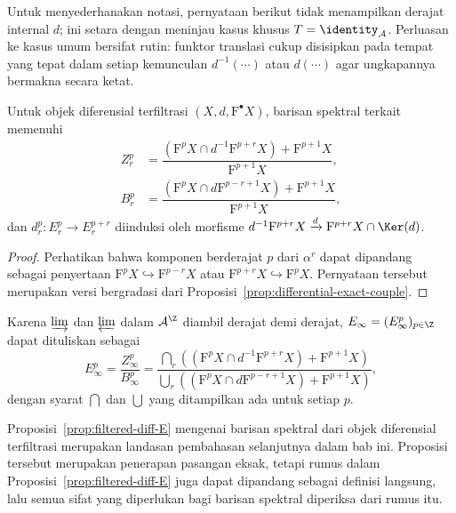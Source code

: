 Untuk menyederhanakan notasi, pernyataan berikut tidak menampilkan derajat
internal $d$; ini setara dengan meninjau kasus khusus
$T=\identity_{\mathcal{A}}$. Perluasan ke kasus umum bersifat rutin: funktor
translasi cukup disisipkan pada tempat yang tepat dalam setiap kemunculan
$d^{-1}(\cdots)$ atau $d(\cdots)$ agar ungkapannya bermakna secara ketat.

\begin{proposition}\label{prop:filtered-diff-E}
	Untuk objek diferensial terfiltrasi $(X,d,\mathrm{F}^\bullet X)$, barisan
	spektral terkait memenuhi
	\begin{align*}
		Z_r^p&=\dfrac{\left(\mathrm{F}^pX\cap d^{-1}\mathrm{F}^{p+r}X\right)
		+\mathrm{F}^{p+1}X}{\mathrm{F}^{p+1}X}, \\
		B_r^p&=\dfrac{\left(\mathrm{F}^pX\cap d\mathrm{F}^{p-r+1}X\right)
		+\mathrm{F}^{p+1}X}{\mathrm{F}^{p+1}X},
	\end{align*}
	dan $d_r^p:E_r^p\to E_r^{p+r}$ diinduksi oleh morfisme
	$d^{-1}\mathrm{F}^{p+r}X\xrightarrow{d}
	\mathrm{F}^{p+r}X\cap\Ker(d)$.
\end{proposition}
\begin{proof}
	Perhatikan bahwa komponen berderajat $p$ dari $\alpha^r$ dapat dipandang
	sebagai penyertaan $\mathrm{F}^pX\hookrightarrow\mathrm{F}^{p-r}X$ atau
	$\mathrm{F}^{p+r}X\hookrightarrow\mathrm{F}^pX$. Pernyataan tersebut
	merupakan versi bergradasi dari
	Proposisi~\ref{prop:differential-exact-couple}.
\end{proof}

Karena $\varinjlim$ dan $\varprojlim$ dalam $\mathcal{A}^{\Z}$ diambil
derajat demi derajat, $E_\infty=(E_\infty^p)_{p\in\Z}$ dapat dituliskan
sebagai
\begin{equation}\label{eqn:filtered-diff-infty}
	E_\infty^p=\dfrac{Z_\infty^p}{B_\infty^p}
	=\dfrac{\bigcap_r\left((\mathrm{F}^pX\cap d^{-1}\mathrm{F}^{p+r}X)
	+\mathrm{F}^{p+1}X\right)}
	{\bigcup_r\left((\mathrm{F}^pX\cap d\mathrm{F}^{p-r+1}X)
	+\mathrm{F}^{p+1}X\right)},
\end{equation}
dengan syarat $\bigcap$ dan $\bigcup$ yang ditampilkan ada untuk setiap $p$.

\begin{remark}
	Proposisi~\ref{prop:filtered-diff-E} mengenai barisan spektral dari objek
	diferensial terfiltrasi merupakan landasan pembahasan selanjutnya dalam bab
	ini. Proposisi tersebut merupakan penerapan pasangan eksak, tetapi rumus
	dalam Proposisi~\ref{prop:filtered-diff-E} juga dapat dipandang sebagai
	definisi langsung, lalu semua sifat yang diperlukan bagi barisan spektral
	diperiksa dari rumus itu.
\end{remark}

